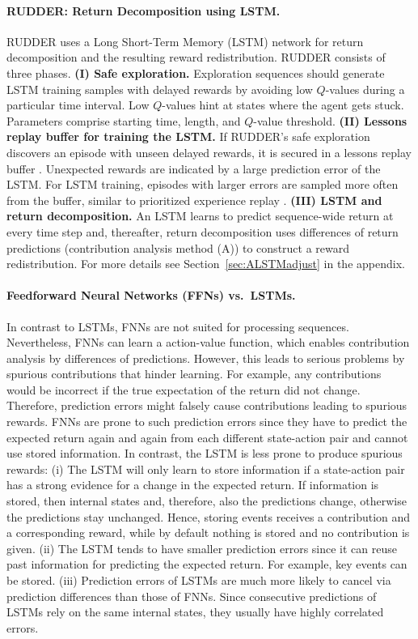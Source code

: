 \documentclass{article}
\begin{document}
\paragraph{RUDDER: Return Decomposition using LSTM.}
RUDDER uses a Long Short-Term Memory (LSTM) network for 
return decomposition and the resulting reward redistribution.
RUDDER consists of three phases. 
{\bf (I) Safe exploration.}
Exploration sequences should generate LSTM training samples 
with delayed rewards by avoiding 
low $Q$-values during a particular time interval. 
Low $Q$-values hint at states where the agent gets stuck. 
Parameters comprise starting time, length, and $Q$-value threshold.
{\bf (II) Lessons replay buffer for training the LSTM.}
If RUDDER's safe exploration discovers 
an episode with unseen delayed rewards,
it is secured in a lessons replay buffer \cite{Lin:93}. 
Unexpected rewards are indicated by a large prediction error of the LSTM.
For LSTM training, episodes with larger errors are sampled more often 
from the buffer, similar to prioritized
experience replay \cite{Schaul:15}.
{\bf (III) LSTM and return decomposition.}
An LSTM learns to predict sequence-wide return at 
every time step and, thereafter, 
return decomposition uses differences of return predictions
(contribution analysis method (A)) to construct a reward redistribution. 
For more details see Section~\ref{sec:ALSTMadjust} in the appendix.


\paragraph{Feedforward Neural Networks (FFNs) vs.\ LSTMs.}
In contrast to LSTMs, 
FNNs are not suited for processing sequences. 
Nevertheless, FNNs can learn a action-value function, which 
enables contribution analysis by 
differences of predictions. 
However, this leads to serious problems by spurious contributions
that hinder learning.
For example, any contributions would be incorrect
if the true expectation of the return did not change. 
Therefore, prediction errors might falsely cause contributions 
leading to spurious rewards. 
FNNs are prone to such prediction errors since they
have to predict the expected return
again and again from each different state-action pair and 
cannot use stored information.
In contrast, the LSTM is less prone to produce spurious 
rewards:
(i) The LSTM will only learn to store information 
if a state-action pair has a strong evidence 
for a change in the expected return. 
If information is stored, then internal states and,
therefore, also the predictions change, otherwise the predictions
stay unchanged.
Hence, storing events receives a contribution and
a corresponding reward, while by default nothing is stored and 
no contribution is given.
(ii) The LSTM tends to have smaller prediction errors since it can 
reuse past information for predicting the expected return. 
For example, key events can be stored.
(iii) Prediction errors of LSTMs are much more likely to cancel 
via prediction differences than those of FNNs. 
Since consecutive predictions of LSTMs rely on the same
internal states, they usually have highly correlated errors.
\end{document}
